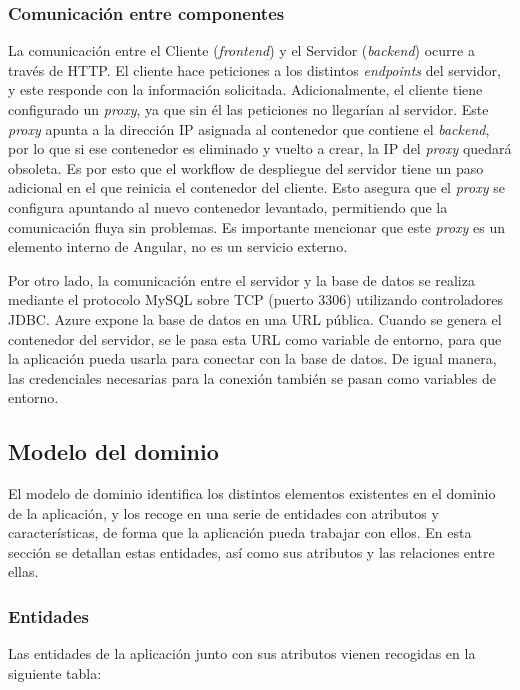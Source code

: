 \subsubsection{Comunicación entre componentes}
La comunicación entre el Cliente (\textit{frontend}) y el Servidor (\textit{backend}) ocurre a través de HTTP. El cliente hace peticiones a los distintos \textit{endpoints} del servidor, y este responde con la información solicitada. Adicionalmente, el cliente tiene configurado un \textit{proxy}, ya que sin él las peticiones no llegarían al servidor. Este \textit{proxy} apunta a la dirección IP asignada al contenedor que contiene el \textit{backend}, por lo que si ese contenedor es eliminado y vuelto a crear, la IP del \textit{proxy} quedará obsoleta. Es por esto que el workflow de despliegue del servidor tiene un paso adicional en el que reinicia el contenedor del cliente. Esto asegura que el \textit{proxy} se configura apuntando al nuevo contenedor levantado, permitiendo que la comunicación fluya sin problemas. Es importante mencionar que este \textit{proxy} es un elemento interno de Angular, no es un servicio externo.

Por otro lado, la comunicación entre el servidor y la base de datos se realiza mediante el protocolo MySQL sobre TCP (puerto 3306) utilizando controladores JDBC. Azure expone la base de datos en una URL pública. Cuando se genera el contenedor del servidor, se le pasa esta URL como variable de entorno, para que la aplicación pueda usarla para conectar con la base de datos. De igual manera, las credenciales necesarias para la conexión también se pasan como variables de entorno.

\subsection{Modelo del dominio} 
El modelo de dominio identifica los distintos elementos existentes en el dominio de la aplicación, y los recoge en una serie de entidades con atributos y características, de forma que la aplicación pueda trabajar con ellos. En esta sección se detallan estas entidades, así como sus atributos y las relaciones entre ellas.

\subsubsection{Entidades}
Las entidades de la aplicación junto con sus atributos vienen recogidas en la siguiente tabla:

